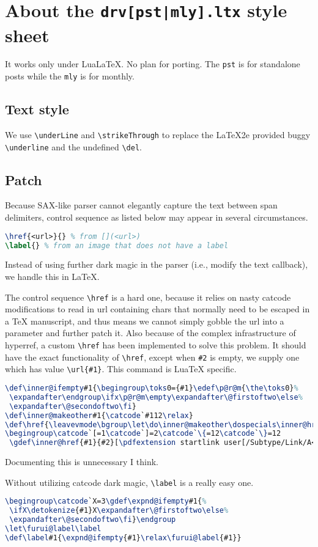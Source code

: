\chapter{About the \texttt{drv[pst|mly].ltx} style sheet}
It works only under LuaLaTeX. No plan for porting. The \verb!pst! is for standalone posts while the \verb!mly! is for monthly.\par
\section{Text style}
We use \verb!\underLine! and \verb!\strikeThrough! to replace the LaTeX2e provided buggy \verb!\underline! and the undefined \verb!\del!.\par
\section{Patch}
Because SAX-like parser cannot elegantly capture the text between span delimiters, control sequence as listed below may appear in several circumstances.\par
\begin{lstlisting}[language=TeX]
\href{<url>}{} % from [](<url>)
\label{} % from an image that does not have a label
\end{lstlisting}
Instead of using further dark magic in the parser (i.e., modify the text callback), we handle this in LaTeX.\par
The control sequence \verb!\href! is a hard one, because it relies on nasty catcode modifications to read in url containing chars that normally need to be escaped in a TeX manuscript, and thus means we cannot simply gobble the url into a parameter and further patch it.
Also because of the complex infrastructure of hyperref, a custom \verb!\href! has been implemented to solve this problem. It should have the exact functionality of \verb!\href!, except when \verb!#2! is empty, we supply one which has value \verb!\url{#1}!.
This command is LuaTeX specific.\par
\begin{lstlisting}[language=TeX]
\def\inner@ifempty#1{\begingroup\toks0={#1}\edef\p@r@m{\the\toks0}%
 \expandafter\endgroup\ifx\p@r@m\empty\expandafter\@firstoftwo\else%
 \expandafter\@secondoftwo\fi}
\def\inner@makeother#1{\catcode`#112\relax}
\def\href{\leavevmode\bgroup\let\do\inner@makeother\dospecials\inner@href}
\begingroup\catcode`[=1\catcode`]=2\catcode`\{=12\catcode`\}=12
 \gdef\inner@href{#1}{#2}[\pdfextension startlink user[/Subtype/Link/A<</Type/Action/S/URI/URI(#1)>>]\inner@ifempty[#2][\url[#1]][#2]\pdfextension endlink \egroup]\endgroup
\end{lstlisting}
Documenting this is unnecessary I think.\par
Without utilizing catcode dark magic, \verb!\label! is a really easy one.\par
\begin{lstlisting}[language=TeX]
\begingroup\catcode`X=3\gdef\expnd@ifempty#1{%
 \ifX\detokenize{#1}X\expandafter\@firstoftwo\else%
 \expandafter\@secondoftwo\fi}\endgroup
\let\furui@label\label
\def\label#1{\expnd@ifempty{#1}\relax\furui@label{#1}}
\end{lstlisting}
